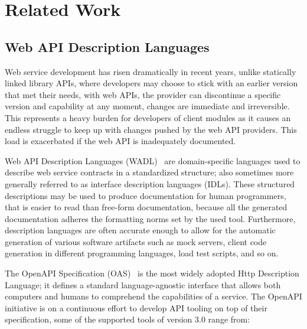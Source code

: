 
%

\chapter{Related Work}
\label{cha:related_work}

\section{Web API Description Languages} %
\label{sec:web_api_description_languages}

Web service development has risen dramatically in recent years,  unlike statically linked library APIs,
where developers may choose to stick with an earlier version that met their needs, with web APIs,
the provider can discontinue a specific version and capability at any moment, changes are immediate and irreversible.
This represents a heavy burden for developers of client modules as it causes an endless struggle to keep up
with changes pushed by the web API providers.
This load is exacerbated if the web API is inadequately documented.

Web API Description Languages (WADL)~\cite{webapi} are domain-specific languages used to describe web service contracts in a standardized structure;
also sometimes more generally referred to as interface description languages (IDLs).
These structured descriptions may be used to produce documentation for human programmers, that is easier to read than free-form documentation,
because all the generated documentation adheres the formatting norms set by the used tool.
Furthermore, description languages are often accurate enough to allow for the automatic generation of various software artifacts such as mock servers,
client code generation in different programming languages, load test scripts, and so on.

The OpenAPI Specification (OAS)~\cite{openAPI} is the most widely adopted Http Description Language;
it defines a standard language-agnostic interface that allows both computers and humans to comprehend the capabilities of a service.
The OpenAPI initiative is on a continuous effort to develop API tooling on top of their specification, some of the supported tools of version 3.0 range from:

